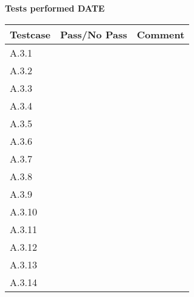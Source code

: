 \renewcommand{\testdate}{DATE}
\textbf{ Tests performed \testdate}
\begin{center}
  	\begin{tabular}{| p{3cm} | p{5cm} | p{5cm} |}
    		\hline
	    	\textbf{Testcase}			& \textbf{Pass/No Pass} 	& \textbf{Comment} \\ \hline
    		A.3.1		 						&  										&  				\\ \hline
    		A.3.2		 						&  										& 				 \\	\hline
    		A.3.3		 						&  										& 				 \\	\hline
    		A.3.4		 						&  										& 				 \\	\hline
    		A.3.5		 						&  										& 				 \\	\hline
    		A.3.6		 						&  										& 				 \\	\hline
    		A.3.7		 						&  										& 				 \\	\hline
    		A.3.8		 						&  										& 				 \\	\hline
    		A.3.9		 						&  										& 				 \\	\hline
    		A.3.10	 							&  										& 				 \\	\hline
    		A.3.11	 							&  										& 				 \\	\hline
    		A.3.12	 							&  										& 				 \\	\hline
    		A.3.13	 							&  										& 				 \\	\hline
    		A.3.14	 							&  										& 				 \\	\hline
 	\end{tabular}
\end{center}